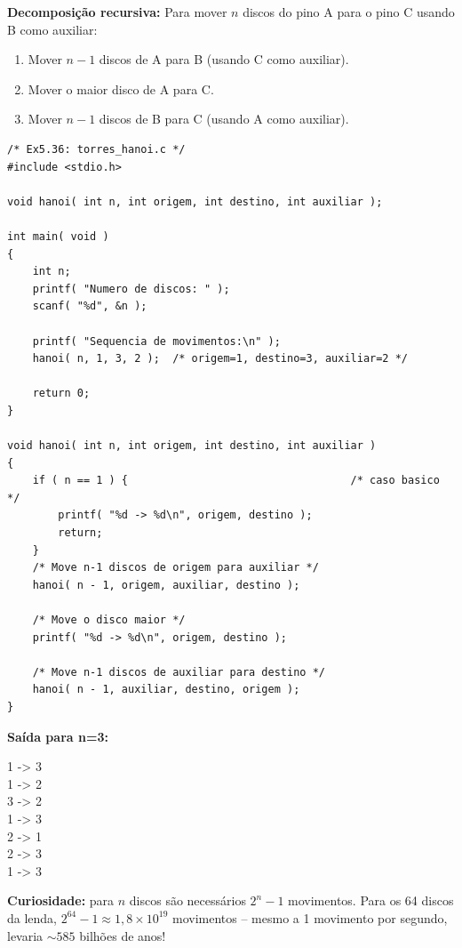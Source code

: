 \documentclass[12pt,a4paper]{article}
\begin{document}
\begin{respostabox}
\textbf{Decomposição recursiva:} Para mover $n$ discos do pino A para o pino C usando
B como auxiliar:
\begin{enumerate}[noitemsep]
  \item Mover $n-1$ discos de A para B (usando C como auxiliar).
  \item Mover o maior disco de A para C.
  \item Mover $n-1$ discos de B para C (usando A como auxiliar).
\end{enumerate}

\begin{lstlisting}
/* Ex5.36: torres_hanoi.c */
#include <stdio.h>

void hanoi( int n, int origem, int destino, int auxiliar );

int main( void )
{
    int n;
    printf( "Numero de discos: " );
    scanf( "%d", &n );

    printf( "Sequencia de movimentos:\n" );
    hanoi( n, 1, 3, 2 );  /* origem=1, destino=3, auxiliar=2 */

    return 0;
}

void hanoi( int n, int origem, int destino, int auxiliar )
{
    if ( n == 1 ) {                                   /* caso basico */
        printf( "%d -> %d\n", origem, destino );
        return;
    }
    /* Move n-1 discos de origem para auxiliar */
    hanoi( n - 1, origem, auxiliar, destino );

    /* Move o disco maior */
    printf( "%d -> %d\n", origem, destino );

    /* Move n-1 discos de auxiliar para destino */
    hanoi( n - 1, auxiliar, destino, origem );
}
\end{lstlisting}

\textbf{Saída para n=3:}
\begin{saida}
1 -> 3\\1 -> 2\\3 -> 2\\1 -> 3\\2 -> 1\\2 -> 3\\1 -> 3
\end{saida}

\textbf{Curiosidade:} para $n$ discos são necessários $2^n - 1$ movimentos. Para
os 64 discos da lenda, $2^{64} - 1 \approx 1{,}8 \times 10^{19}$ movimentos --
mesmo a 1 movimento por segundo, levaria $\sim 585$ bilhões de anos!
\end{respostabox}
\end{document}
